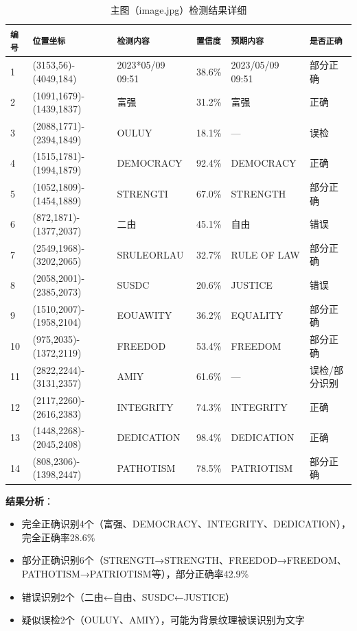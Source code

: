 \documentclass[12pt,hyperref,a4paper,UTF8]{ctexart}
\begin{document}
\begin{table}[!htbp]
    \centering
    \small
    \begin{tabular}{l|l|l|l|l|l}
        \hline
        \texttt{编号} & \texttt{位置坐标} & \texttt{检测内容} & \texttt{置信度} & \texttt{预期内容} & \texttt{是否正确} \\
        \hline
        1 & (3153,56)-(4049,184) & 2023*05/09 09:51 & 38.6\% & 2023/05/09 09:51 & 部分正确 \\
        2 & (1091,1679)-(1439,1837) & 富强 & 31.2\% & 富强 & 正确 \\
        3 & (2088,1771)-(2394,1849) & OULUY & 18.1\% & — & 误检 \\
        4 & (1515,1781)-(1994,1879) & DEMOCRACY & 92.4\% & DEMOCRACY & 正确 \\
        5 & (1052,1809)-(1454,1889) & STRENGTI & 67.0\% & STRENGTH & 部分正确 \\
        6 & (872,1871)-(1377,2037) & 二由 & 45.1\% & 自由 & 错误 \\
        7 & (2549,1968)-(3202,2065) & SRULEORLAU & 32.7\% & RULE OF LAW & 部分正确 \\
        8 & (2058,2001)-(2385,2073) & SUSDC & 20.6\% & JUSTICE & 错误 \\
        9 & (1510,2007)-(1958,2104) & EOUAWITY & 36.2\% & EQUALITY & 部分正确 \\
        10 & (975,2035)-(1372,2119) & FREEDOD & 53.4\% & FREEDOM & 部分正确 \\
        11 & (2822,2244)-(3131,2357) & AMIY & 61.6\% & — & 误检/部分识别 \\
        12 & (2117,2260)-(2616,2383) & INTEGRITY & 74.3\% & INTEGRITY & 正确 \\
        13 & (1448,2268)-(2045,2408) & DEDICATION & 98.4\% & DEDICATION & 正确 \\
        14 & (808,2306)-(1398,2447) & PATHOTISM & 78.5\% & PATRIOTISM & 部分正确 \\
        \hline
    \end{tabular}
    \caption{主图（image.jpg）检测结果详细}
    \label{tab:main_results}
\end{table}

\textbf{结果分析}：
\begin{itemize}
    \item 完全正确识别4个（富强、DEMOCRACY、INTEGRITY、DEDICATION），完全正确率28.6\%
    \item 部分正确识别6个（STRENGTI→STRENGTH、FREEDOD→FREEDOM、PATHOTISM→PATRIOTISM等），部分正确率42.9\%
    \item 错误识别2个（二由←自由、SUSDC←JUSTICE）
    \item 疑似误检2个（OULUY、AMIY），可能为背景纹理被误识别为文字
\end{itemize}
\end{document}
